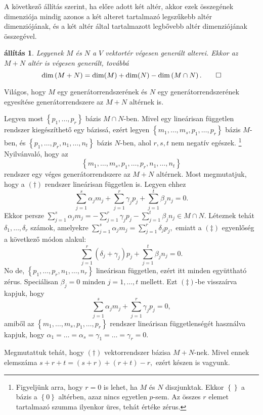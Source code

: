 \documentclass[9pt, a4paper, showtrims]{memoir}
\makeatletter
\renewenvironment{proof}[1][\proofname]
    {\par\pushQED{\qed}%
    \normalfont \topsep6\p@\@plus6\p@\relax
    \trivlist
    \item[\hskip\labelsep
        \itshape
    #1\@addpunct{:}]\ignorespaces}
    {\popQED\endtrivlist\@endpefalse}
\theoremstyle{plain}
\newtheorem{proposition}{állítás}[chapter]
\theoremstyle{remark}
\theoremstyle{definition}
\makeatother
\begin{document}
A következő állítás szerint,
ha előre adott két altér, akkor ezek összegének dimenziója mindig azonos
a két alteret tartalmazó legszűkebb altér dimenziójának,
és a két altér által tartalmazott legbővebb altér  dimenziójának összegével.
\begin{proposition}\label{pr:drosszeg2}
	Legyenek $M$ és $N$ a $V$ vektortér végesen generált alterei.
	Ekkor az $M+N$ altér is végesen generált,
	továbbá
	\[
		\dim\left( M+N \right)=\dim(M)+\dim(N)-\dim \left( M\cap N \right).\qedhere
	\]
\end{proposition}
\begin{proof}
	Világos, hogy $M$ egy generátorrendszerének és $N$ egy generátorrendszerének egyesítése
	generátorrendszere az $M+N$ altérnek is.

	Legyen most $\left\{ p_1,\ldots,p_r \right\}$ bázis $M\cap N$-ben.
	Mivel egy lineárisan független rendszer kiegészíthető egy bázissá,
	ezért legyen
	$\left\{ m_1,\ldots,m_s,p_1,\ldots,p_r \right\}$ bázis $M$-ben,
	és
	$\left\{ p_1,\ldots,p_r,n_1,\ldots,n_t \right\}$ bázis $N$-ben,
	ahol $r,s,t$ nem negatív egészek.%
	\footnote{
		Figyeljünk arra, hogy $r=0$ is lehet, ha $M$ és $N$ diszjunktak.
		Ekkor $\left\{  \right\}$ a bázis a $\left\{ 0 \right\}$ altérben,
		azaz nincs egyetlen $p$-sem.
		Az összes $r$ elemet tartalmazó szumma ilyenkor üres, tehát értéke zérus.
	}
	Nyilvánvaló, hogy az
	\[
		\left\{ m_1,\ldots,m_s,p_1,\ldots,p_r,n_1,\ldots,n_t \right\}\tag{\dag}
	\]
	rendszer egy véges generátorrendszere az $M+N$ altérnek.
	Most megmutatjuk,
	hogy a $(\dag)$ rendszer lineárisan független is.
	Legyen ehhez
	\[
		\sum_{j=1}^s\alpha_j m_j+\sum_{j=1}^r\gamma_j p_j+\sum_{j=1}^t\beta_jn_j=0.\tag{\ddag}
	\]
	Ekkor persze
	\(
	\sum_{j=1}^s\alpha_j m_j =
	-\sum_{j=1}^r\gamma_j p_j
	-\sum_{j=1}^t\beta_jn_j
	\in
	M\cap N.
	\)
	Léteznek tehát $\delta_1,\ldots,\delta_r$ számok,
	amelyekre
	\(
	\sum_{j=1}^s\alpha_j m_j=
	\sum_{j=1}^r\delta_j p_j,
	\)
	emiatt a $(\ddag)$ egyenlőség a következő módon alakul:
	\[
		\sum_{j=1}^r\left( \delta_j+\gamma_j \right)p_j+\sum_{j=1}^t\beta_jn_j=0.
	\]
	No de, $\left\{ p_1,\ldots,p_r,n_1,\ldots,n_r \right\}$ lineárisan független,
	ezért itt minden együttható zérus.
	Speciálisan $\beta_j=0$ minden $j=1,\ldots,t$ mellett.
	Ezt $(\ddag)$-be visszaírva kapjuk, hogy
	\[
		\sum_{j=1}^s\alpha_j m_j+\sum_{j=1}^r\gamma_j p_j=0,
	\]
	amiből az $\left\{ m_1,\ldots,m_s,p_1,\ldots,p_r \right\}$ rendszer lineárisan függetlenségét használva kapjuk,
	hogy $\alpha_1=\dots=\alpha_s=\gamma_1=\dots=\gamma_r=0$.


	Megmutattuk tehát, hogy $(\dag)$ vektorrendszer bázisa $M+N$-nek.
	Mivel ennek elemszáma
	\begin{math}
		s+r+t=\left( s+r \right)+\left( r+t \right)-r,
	\end{math}
	ezért készen is vagyunk.
\end{proof}
\end{document}

